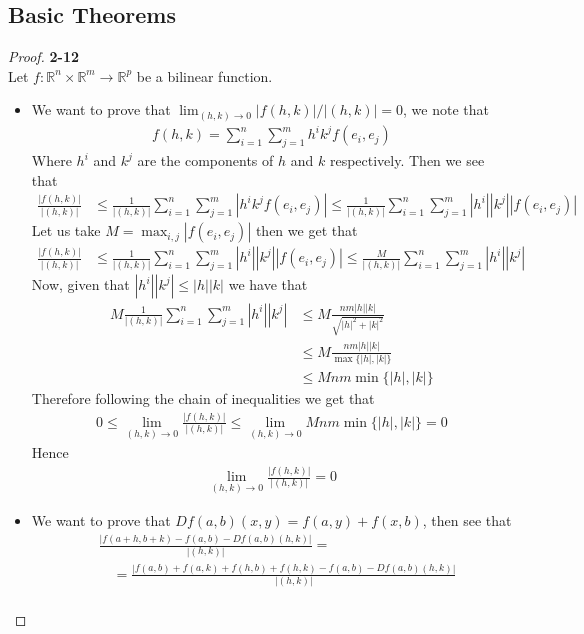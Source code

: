 \documentclass[11pt]{article}
\newcommand{\R}{\mathbb{R}}
\theoremstyle{definition}
\begin{document}
\cleardoublepage
\subsection*{Basic Theorems}
\begin{proof}{\textbf{2-12}}\\
Let $f:\R^n \times \R^m \to \R^p$ be a bilinear function.
\begin{itemize}
\item[(a)] We want to prove that $\lim_{(h,k)\to 0}|f(h,k)|/|(h,k)| = 0$, we
note that
\begin{align*}
    f(h,k) = \sum_{i= 1}^n\sum_{j=1}^m h^ik^jf(e_i, e_j)
\end{align*}
Where $h^i$ and $k^j$ are the components of $h$ and $k$ respectively. Then
we see that
\begin{align*}
    \frac{|f(h,k)|}{|(h,k)|}
    &\leq \frac{1}{|(h,k)|}\sum_{i= 1}^n\sum_{j=1}^m |h^ik^jf(e_i, e_j)|
    \leq \frac{1}{|(h,k)|}\sum_{i= 1}^n\sum_{j=1}^m |h^i||k^j||f(e_i, e_j)|
\end{align*}
Let us take $M = \max_{i,j}{|f(e_i, e_j)|}$ then we get that
\begin{align*}
    \frac{|f(h,k)|}{|(h,k)|}
    &\leq \frac{1}{|(h,k)|}\sum_{i= 1}^n\sum_{j=1}^m |h^i||k^j||f(e_i, e_j)|
    \leq \frac{M}{|(h,k)|}\sum_{i= 1}^n\sum_{j=1}^m |h^i||k^j|
\end{align*}
Now, given that $|h^i||k^j| \leq |h||k|$ we have that
\begin{align*}
    M\frac{1}{|(h,k)|}\sum_{i= 1}^n\sum_{j=1}^m |h^i||k^j|
    &\leq M\frac{nm|h||k|}{\sqrt{|h|^2 + |k|^2}}\\
    &\leq M \frac{nm|h||k|}{\max\{|h|, |k|\}}\\
    &\leq M nm \min\{|h|,|k|\}
\end{align*}
Therefore following the chain of inequalities we get that
\begin{align*}
    0 \leq \lim_{(h,k)\to 0} \frac{|f(h,k)|}{|(h,k)|}
    \leq \lim_{(h,k) \to 0}M nm \min\{|h|,|k|\} = 0
\end{align*}
Hence
\begin{align*}
    \lim_{(h,k)\to 0} \frac{|f(h,k)|}{|(h,k)|} = 0
\end{align*}
\item[(b)] We want to prove that $Df(a,b)(x,y) = f(a,y) + f(x,b)$, then
see that
\begin{align*}
    &\frac{|f(a + h, b + k) - f(a,b) - Df(a,b)(h,k)|}{|(h,k)|} =\\
    &\quad= \frac{|f(a,b) + f(a, k) + f(h, b) + f(h,k) - f(a,b) - Df(a,b)(h,k)|}{|(h,k)|}\\

\end{align*}
\end{itemize}
\end{proof}
\end{document}
